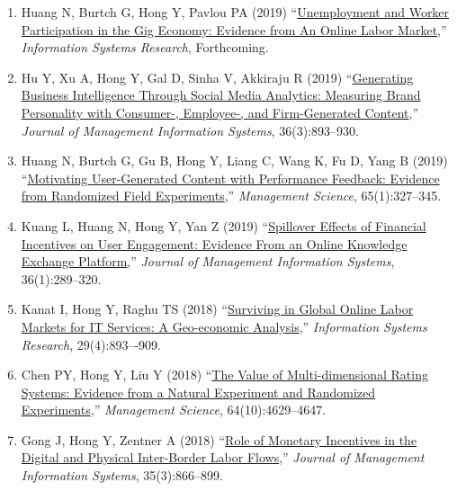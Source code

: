 \documentclass[paper=letter,fontsize=10pt]{scrartcl} %
\newcommand{\PaperEntry}[6]{
		\noindent #1 (#2) ``\href{#6}{#3},'' \textit{#4}, #5.} %
\newcommand{\Hong}{Hong Y}
\begin{document}
\begin{enumerate}

\item \PaperEntry{Huang N, Burtch G, \Hong, Pavlou PA}{2019}{Unemployment and Worker Participation in the Gig Economy: Evidence from An Online Labor Market}{Information Systems Research}{Forthcoming}{https://papers.ssrn.com/sol3/papers.cfm?abstract_id=3105090}

\item \PaperEntry{Hu Y, Xu A, \Hong, Gal D, Sinha V, Akkiraju R}{2019}{Generating Business Intelligence Through Social Media Analytics: Measuring Brand Personality with Consumer-, Employee-, and Firm-Generated Content}{Journal of Management Information Systems}{36(3):893--930}{https://www.tandfonline.com/doi/full/10.1080/07421222.2019.1628908}

\item \PaperEntry{Huang N, Burtch G, Gu B, \Hong, Liang C, Wang K, Fu D, Yang B}{2019}{Motivating User-Generated Content with Performance Feedback: Evidence from Randomized Field Experiments}{Management Science}{65(1):327--345}{https://pubsonline.informs.org/doi/abs/10.1287/mnsc.2017.2944}

\item \PaperEntry{Kuang L, Huang N, \Hong, Yan Z}{2019}{Spillover Effects of Financial Incentives on User Engagement: Evidence From an Online Knowledge Exchange Platform}{Journal of Management Information Systems}{36(1):289--320}{https://www.tandfonline.com/doi/full/10.1080/07421222.2018.1550564}

\item \PaperEntry{Kanat I, \Hong, Raghu TS}{2018}{Surviving in Global Online Labor Markets for IT Services: A Geo-economic Analysis}{Information Systems Research}{29(4):893–-909}{https://pubsonline.informs.org/doi/abs/10.1287/isre.2017.0751}

\item \PaperEntry{Chen PY, \Hong, Liu Y}{2018}{The Value of Multi-dimensional Rating Systems: Evidence from a Natural Experiment and Randomized Experiments}{Management Science}{64(10):4629--4647}{http://pubsonline.informs.org/doi/abs/10.1287/mnsc.2017.2852}

\item \PaperEntry{Gong J, \Hong, Zentner A}{2018}{Role of Monetary Incentives in the Digital and Physical Inter-Border Labor Flows}{Journal of Management Information Systems}{35(3):866--899}{https://www.tandfonline.com/doi/abs/10.1080/07421222.2018.1481661}


\end{enumerate}
\end{document}
